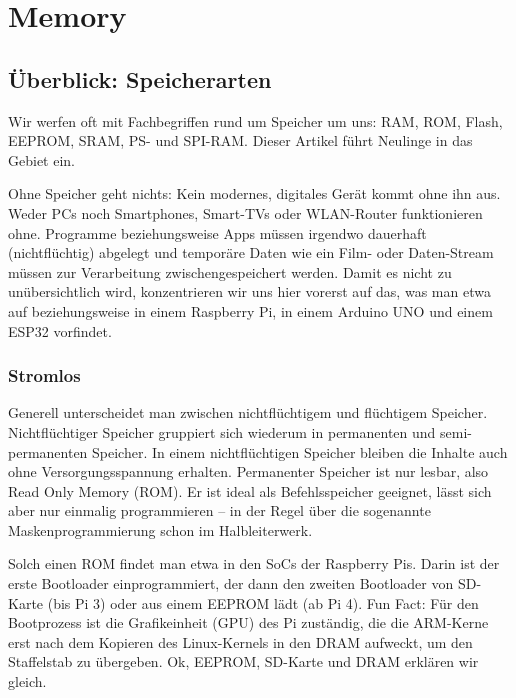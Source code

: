 %
%

\chapter{Memory}


\section{Überblick: Speicherarten}

Wir werfen oft mit Fachbegriffen rund um Speicher um uns: RAM, ROM, Flash, EEPROM, SRAM, PS- und SPI-RAM. Dieser Artikel führt Neulinge in das Gebiet ein.

Ohne Speicher geht nichts: Kein modernes, digitales Gerät kommt ohne ihn aus. Weder PCs noch Smartphones, Smart-TVs oder WLAN-Router funktionieren ohne. Programme beziehungsweise Apps müssen irgendwo dauerhaft (nichtflüchtig) abgelegt und temporäre Daten wie ein Film- oder Daten-Stream müssen zur Verarbeitung zwischengespeichert werden. Damit es nicht zu unübersichtlich wird, konzentrieren wir uns hier vorerst auf das, was man etwa auf beziehungsweise in einem Raspberry Pi, in einem Arduino UNO und einem ESP32 vorfindet.

\subsection{Stromlos}

Generell unterscheidet man zwischen nichtflüchtigem und flüchtigem Speicher. Nichtflüchtiger Speicher gruppiert sich wiederum in permanenten und semi-permanenten Speicher. In einem nichtflüchtigen Speicher bleiben die Inhalte auch ohne Versorgungsspannung erhalten. Permanenter Speicher ist nur lesbar, also Read Only Memory (ROM). Er ist ideal als Befehlsspeicher geeignet, lässt sich aber nur einmalig programmieren – in der Regel über die sogenannte Maskenprogrammierung schon im Halbleiterwerk.
    
Solch einen ROM findet man etwa in den SoCs der Raspberry Pis. Darin ist der erste Bootloader einprogrammiert, der dann den zweiten Bootloader von SD-Karte (bis Pi 3) oder aus einem EEPROM lädt (ab Pi 4). Fun Fact: Für den Bootprozess ist die Grafikeinheit (GPU) des Pi zuständig, die die ARM-Kerne erst nach dem Kopieren des Linux-Kernels in den DRAM aufweckt, um den Staffelstab zu übergeben. Ok, EEPROM, SD-Karte und DRAM erklären wir gleich.

